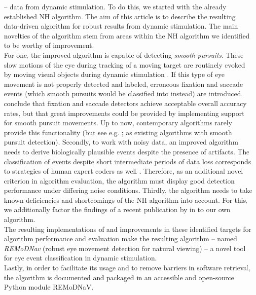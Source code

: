     -- data from dynamic stimulation. To do this, we started with the already established NH algorithm.
    The aim of this article is to describe the resulting data-driven algorithm for robust results from dynamic
    stimulation. The main novelties of the algorithm stem from areas within the NH algorithm we identified to be
    worthy of improvement. \\
    For one, the improved algorithm is capable of detecting \textit{smooth pursuits}. These slow motions of the eye
    during tracking of a moving target are routinely evoked by moving visual objects during dynamic stimulation
    \citep{carl1987pursuits}. If this type of eye movement is not properly detected and labeled, erroneous fixation and
    saccade events (which smooth pursuits would be classified into instead)  are introduced. \cite{Andersson2017}
    conclude that fixation and saccade detectors achieve acceptable overall accuracy rates, but that great improvements
    could be provided by implementing support for smooth pursuit movements. Up to now, contemporary algorithms rarely
    provide this functionality (but see e.g. \cite{LARSSON2015145}; \cite{Komogortsev2013} as existing algorithms with
    smooth pursuit detection). Secondly, to work with noisy data, an improved algorithm needs to derive biologically
    plausible events despite the presence of artifacts. The classification of events despite short intermediate periods
    of data loss corresponds to strategies of human expert coders as well \citep{Hooge2018}. Therefore, as an additional
    novel criterion in algorithm evaluation, the algorithm must display good detection performance under differing noise
    conditions. Thirdly, the algorithm needs to take known deficiencies and shortcomings of the NH algorithm into
    account. For this, we additionally factor the findings of a recent publication by \cite{Friedman2018} in to our own
    algorithm. \\
    The resulting implementations of and improvements in these identified targets for algorithm performance and
    evaluation make the resulting algorithm -- named \textit{REMoDNav} (robust eye movement detection for natural
    viewing) -- a novel tool for eye event classification in dynamic stimulation.\\
    Lastly, in order to facilitate its usage and to remove barriers in software retrieval, the \remodnav algorithm is
    documented and packaged in an accessible and open-source Python module REMoDNaV. \\


